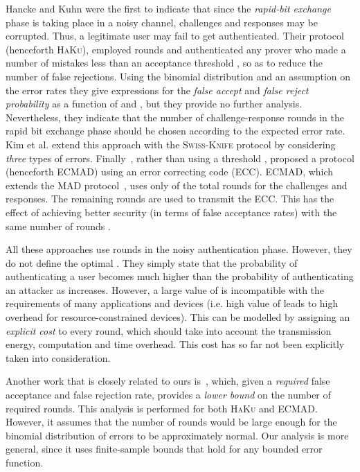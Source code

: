 \documentclass[a4paper]{article}
\newcommand \Swiss {\textsc{Swiss-Knife}}
\newcommand \ECMAD {\textsc{ECMAD}}
\newcommand \MAD {\textsc{MAD}}
\newcommand \Hancke {\textsc{HaKu}}
\theoremstyle{plain} \newtheorem{remark}{Remark}
\theoremstyle{plain} \newtheorem{definition}{Definition}
\theoremstyle{plain} \newtheorem{example}{Example}
\theoremstyle{plain} \newtheorem{assumption}{Assumption}
\theoremstyle{plain} \newtheorem{conjecture}{Conjecture}
\theoremstyle{plain} \newtheorem{theorem}{Theorem}
\theoremstyle{plain} \newtheorem{proposition}{Proposition}
\theoremstyle{plain} \newtheorem{lemma}{Lemma}
\theoremstyle{plain} \newtheorem{corollary}{Corollary}
\begin{document}
Hancke and Kuhn \cite{hancke05} were the first to indicate that since
the \textit{rapid-bit exchange} phase is taking place in a noisy
channel, challenges and responses may be corrupted.  Thus, a
legitimate user may fail to get authenticated.  Their protocol (henceforth
\Hancke), employed  rounds and authenticated any prover who made a
number of mistakes  less than an acceptance threshold , so
as to reduce the number of false rejections.  Using the binomial
distribution and an assumption on the error rates they give
expressions for the \textit{false accept} and \textit{false reject
  probability} as a function of  and , but they provide no
further analysis.  Nevertheless, they indicate that the number of
challenge-response rounds  in the rapid bit exchange phase should
be chosen according to the expected error rate.  Kim et
al. \cite{KimAKSP-2008-icisc} extend this approach with the {\Swiss}
protocol by considering {\em three} types of errors. 
Finally~\cite{singelee1}, rather than using a threshold ,
proposed a protocol (henceforth {\ECMAD}) using an error correcting
code (ECC).  {\ECMAD}, which extends the {\MAD}
protocol~\cite{capkun}, uses only  of the  total rounds for the
challenges and responses. The remaining  rounds are used to
transmit the  ECC.  This has the effect of achieving better
security (in terms of false acceptance rates) with the same number of
rounds .

All these approaches use  rounds in the noisy authentication phase.
However, they do not define the optimal .  They simply state that
the probability of authenticating a user becomes much higher than the
probability of authenticating an attacker as  increases.  However,
a large value of  is incompatible with the requirements of many
applications and devices (i.e. high value of  leads to high
overhead for resource-constrained devices). This can be modelled by
assigning an {\em explicit cost} to every round, which should take
into account the transmission energy, computation and time overhead.
This cost has so far not been explicitly taken into consideration.


Another work that is closely related to ours is~\cite{singelee2},
which, given a {\em required} false acceptance and false rejection
rate, provides a {\em lower bound} on the number of required
rounds. This analysis is performed for both {\Hancke} and
{\ECMAD}. However, it assumes that the number of rounds  would be
large enough for the binomial distribution of errors to be
approximately normal.  Our analysis is more general, since it uses
finite-sample bounds that hold for any bounded error function.
\end{document}
